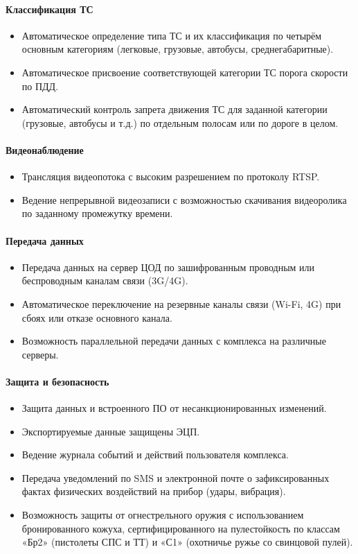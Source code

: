 \documentclass[specification,annotation,times]{itmo-student-thesis}
\begin{document}
\paragraph{Классификация ТС}
\begin{itemize}
	\item  Автоматическое определение типа ТС и их классификация по четырём основным категориям (легковые, грузовые, автобусы, среднегабаритные).
	\item  Автоматическое присвоение соответствующей категории ТС порога скорости по ПДД.
	\item  Автоматический контроль запрета движения ТС для заданной категории (грузовые, автобусы и т.д.) по отдельным полосам или по дороге в целом.
\end{itemize}

\paragraph{Видеонаблюдение}
\begin{itemize}
	\item Трансляция видеопотока с высоким разрешением по протоколу RTSP.
	\item Ведение непрерывной видеозаписи с возможностью скачивания видеоролика по заданному промежутку времени.
\end{itemize}

\paragraph{Передача данных}
\begin{itemize}
	\item Передача данных на сервер ЦОД по зашифрованным проводным или беспроводным каналам связи (3G/4G).
	\item Автоматическое переключение на резервные каналы связи (Wi-Fi, 4G) при сбоях или отказе основного канала.
	\item Возможность параллельной передачи данных с комплекса на различные серверы.
\end{itemize}

\paragraph{Защита и безопасность}
\begin{itemize}
	\item Защита данных и встроенного ПО от несанкционированных изменений.
	\item Экспортируемые данные защищены ЭЦП.
	\item Ведение журнала событий и действий пользователя комплекса.
	\item Передача уведомлений по SMS и электронной почте о зафиксированных фактах физических воздействий на прибор (удары, вибрация).
	\item Возможность защиты от огнестрельного оружия с использованием бронированного кожуха, сертифицированного на пулестойкость по классам «Бр2» (пистолеты СПС и ТТ) и «С1» (охотничье ружье со свинцовой пулей).
\end{itemize}
\end{document}
